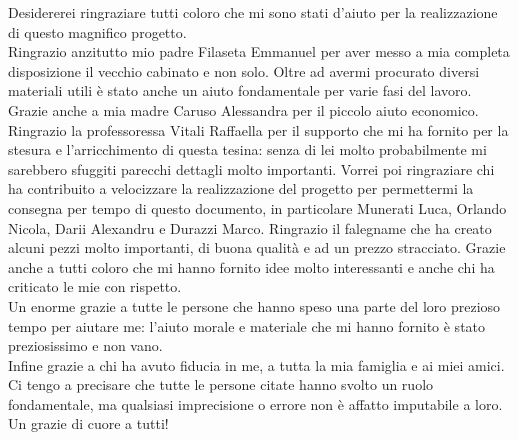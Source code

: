 \begin{thesisacknowledge}[italian]
Desidererei ringraziare tutti coloro che mi sono stati d’aiuto per la realizzazione di questo magnifico progetto.\\Ringrazio anzitutto mio padre Filaseta Emmanuel per aver messo a mia completa disposizione il vecchio cabinato e non solo. Oltre ad avermi procurato diversi materiali utili è stato anche un aiuto fondamentale per varie fasi del lavoro. Grazie anche a mia madre Caruso Alessandra per il piccolo aiuto economico.\\Ringrazio la professoressa Vitali Raffaella per il supporto che mi ha fornito per la stesura e l’arricchimento di questa tesina: senza di lei molto probabilmente mi sarebbero sfuggiti parecchi dettagli molto importanti. Vorrei poi ringraziare chi ha contribuito a velocizzare la realizzazione del progetto per permettermi la consegna per tempo di questo documento, in particolare Munerati Luca, Orlando Nicola, Darii Alexandru e Durazzi Marco. Ringrazio il falegname che ha creato alcuni pezzi molto importanti, di buona qualità e ad un prezzo stracciato. Grazie anche a tutti coloro che mi hanno fornito idee molto interessanti e anche chi ha criticato le mie con rispetto.\\
Un enorme grazie a tutte le persone che hanno speso una parte del loro prezioso tempo per aiutare me: l’aiuto morale e materiale che mi hanno fornito è stato preziosissimo e non vano.\\
Infine grazie a chi ha avuto fiducia in me, a tutta la mia famiglia e ai miei amici. Ci tengo a precisare che tutte le persone citate hanno svolto un ruolo fondamentale, ma qualsiasi imprecisione o errore non è affatto imputabile a loro.\\
Un grazie di cuore a tutti!
\end{thesisacknowledge}

